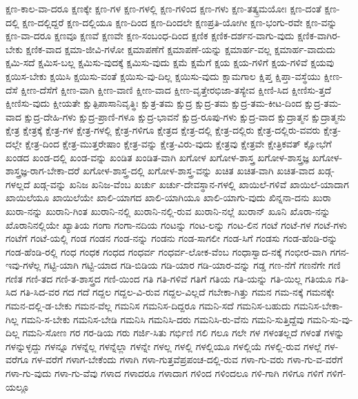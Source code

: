 {ಕ್ಷಣ-ಕಾಲ-ವಾ-ದರೂ
ಕ್ಷಣಕ್ಕೇ
ಕ್ಷಣ-ಗಳ
ಕ್ಷಣ-ಗಳಲ್ಲಿ
ಕ್ಷಣ-ಗಳಿಂದ
ಕ್ಷಣ-ಗಳು
ಕ್ಷಣ-ತತ್ಕ್ರಮಯೋಃ
ಕ್ಷಣ-ದಂತೆ
ಕ್ಷಣ-ದಲ್ಲಿ
ಕ್ಷಣ-ದಲ್ಲಿದ್ದರೆ
ಕ್ಷಣ-ದಲ್ಲಿಯೂ
ಕ್ಷಣ-ದಿಂದ
ಕ್ಷಣ-ದಿಂದಲೇ
ಕ್ಷಣಪ್ರತಿ-ಯೋಗೀ
ಕ್ಷಣ-ಭಂಗು-ರವೇ
ಕ್ಷಣ-ವನ್ನು
ಕ್ಷಣ-ವಾ-ದರೂ
ಕ್ಷಣವೂ
ಕ್ಷಣವೆ
ಕ್ಷಣವೇ
ಕ್ಷಣ-ಸಂಬಂಧ-ದಿಂದ
ಕ್ಷಣಿಕ
ಕ್ಷಣಿಕ-ದರ್ಶನ-ವಾಗು-ವುದು
ಕ್ಷಣಿಕ-ವಾಗಿರ-ಬೇಕು
ಕ್ಷಣಿಕ-ವಾದ
ಕ್ಷಮಾ-ಜೀವಿ-ಗಳೋ
ಕ್ಷಮಾಪಣೆಗೆ
ಕ್ಷಮಾಪಣೆ-ಯನ್ನು
ಕ್ಷಮಾರ್ಹ-ವಲ್ಲ
ಕ್ಷಮಾರ್ಹ-ವಾದುದು
ಕ್ಷಮಿ-ಸದೆ
ಕ್ಷಮಿಸ-ಬಲ್ಲ
ಕ್ಷಮಿಸು-ವುದಕ್ಕೆ
ಕ್ಷಮಿಸು-ವುದು
ಕ್ಷಮೆ
ಕ್ಷಮೆಗೆ
ಕ್ಷಯ
ಕ್ಷಯ-ಗಳಿಗೆ
ಕ್ಷಯ-ಗಳಿವೆ
ಕ್ಷಯವು
ಕ್ಷಯಿಸ-ಬೇಕು
ಕ್ಷಯಿಸಿ
ಕ್ಷಯಿಸು-ವಂತೆ
ಕ್ಷಯಿಸು-ವು-ದಿಲ್ಲ
ಕ್ಷಯಿಸು-ವುದು
ಕ್ಷಾಮಗಾಲ
ಕ್ಷಿಪ್ತ
ಕ್ಷಿಪ್ತಾ-ವಸ್ಥೆಯು
ಕ್ಷೀಣ-ದೆಸೆ
ಕ್ಷೀಣ-ದೆಸೆಗೆ
ಕ್ಷೀಣ-ವಾಗಿ
ಕ್ಷೀಣ-ವಾಣಿ
ಕ್ಷೀಣ-ವಾದ
ಕ್ಷೀಣ-ವೃತ್ತೇರಭಿಜಾ-ತಸ್ಯೇವ
ಕ್ಷೀಣಿ-ಸಿದ
ಕ್ಷೀಣಿಸು-ತ್ತದೆ
ಕ್ಷೀಣಿಸು-ವುದು
ಕ್ಷೀಯತೇ
ಕ್ಷುತ್ಪಿಪಾಸಾನಿವೃತ್ಥಿಃ
ಕ್ಷುತ್ರ-ತಮ
ಕ್ಷುದ್ರ
ಕ್ಷುದ್ರ-ತಮ
ಕ್ಷುದ್ರ-ತಮ-ಕೀಟ-ದಿಂದ
ಕ್ಷುದ್ರ-ತಮ-ವಾದ
ಕ್ಷುದ್ರ-ದೇಹಿ-ಗಳು
ಕ್ಷುದ್ರ-ಪ್ರಾಣಿ-ಗಳೂ
ಕ್ಷುದ್ರ-ಭಾವನೆ
ಕ್ಷುದ್ರ-ರೂಪು-ಗಳು
ಕ್ಷುದ್ರ-ವಾದ
ಕ್ಷುದ್ರಾತ್ಮನ
ಕ್ಷುದ್ರಾತ್ಮನು
ಕ್ಷೇತ್ರ
ಕ್ಷೇತ್ರಕ್ಕೆ
ಕ್ಷೇತ್ರ-ಗಳ
ಕ್ಷೇತ್ರ-ಗಳಲ್ಲಿ
ಕ್ಷೇತ್ರ-ಗಳಿಗೂ
ಕ್ಷೇತ್ರದ
ಕ್ಷೇತ್ರ-ದಲ್ಲಿ
ಕ್ಷೇತ್ರ-ದಲ್ಲಿರು
ಕ್ಷೇತ್ರ-ದಲ್ಲಿರು-ವವರು
ಕ್ಷೇತ್ರ-ದಲ್ಲೇ
ಕ್ಷೇತ್ರ-ದಿಂದ
ಕ್ಷೇತ್ರ-ಮುತ್ತರೇಷಾಂ
ಕ್ಷೇತ್ರ-ವನ್ನು
ಕ್ಷೇತ್ರ-ವಿರು-ವುದು
ಕ್ಷೇತ್ರವು
ಕ್ಷೇತ್ರವೇ
ಕ್ಷೇತ್ರಿಕವತ್
ಕ್ಷೋಭೆಗೆ
ಖಂಡದ
ಖಂಡ-ದಲ್ಲಿ
ಖಂಡ-ವನ್ನು
ಖಂಡಿತ
ಖಂಡಿತ-ವಾಗಿ
ಖಗೋಳ
ಖಗೋಳ-ಶಾಸ್ತ್ರ
ಖಗೋಳ-ಶಾಸ್ತ್ರಜ್ಞ
ಖಗೋಳ-ಶಾಸ್ತ್ರಜ್ಞ-ರಾಗ-ಬೇಕಾ-ದರೆ
ಖಗೋಳ-ಶಾಸ್ತ್ರ-ದಲ್ಲಿ
ಖಗೋಳ-ಶಾಸ್ತ್ರ-ವನ್ನು
ಖಚಿತ
ಖಚಿತ-ವಾಗಿ
ಖಚಿತ-ವಾದ
ಖಡ್ಗ-ಗಳಲ್ಲದೆ
ಖಡ್ಗ-ವನ್ನು
ಖನಿಜ
ಖನಿಜ-ವೆಂಬ
ಖರ್ಚು
ಖರ್ಚು-ದೇವಸ್ಥಾನ-ಗಳಲ್ಲಿ
ಖಾಯಿಲೆ-ಗಳಿವೆ
ಖಾಯಿಲೆ-ಯಾದಾಗ
ಖಾಯಿಲೆಯೂ
ಖಾಯಿಲೆಯೇ
ಖಾಲಿ-ಯಾಗದ
ಖಾಲಿ-ಯಾಗಿಯೂ
ಖಾಲಿ-ಯಾಗು-ವುದು
ಖಿನ್ನನಾ-ದನು
ಖುರಾ
ಖುರಾ-ನನ್ನು
ಖುರಾನಿ-ಗಿಂತ
ಖುರಾನಿ-ನಲ್ಲಿ
ಖುರಾನಿ-ನಲ್ಲಿ-ರುವ
ಖುರಾನಿ-ನಲ್ಲೆ
ಖುರಾನ್
ಖೂನಿ
ಖೊರಾ-ನನ್ನು
ಖೊರಾನಿನಲ್ಲಿಯೇ
ಖ್ಯಾತಿಯ
ಗಂಗಾ
ಗಂಗಾ-ನದಿಯ
ಗಂಟನ್ನು
ಗಂಟ-ಲನ್ನು
ಗಂಟ-ಲಿನ
ಗಂಟೆ
ಗಂಟೆ-ಗಳ
ಗಂಟೆ-ಗಳು
ಗಂಟೆಗೆ
ಗಂಟೆ-ಯಲ್ಲಿ
ಗಂಡ
ಗಂಡನ
ಗಂಡ-ನನ್ನು
ಗಂಡನು
ಗಂಡ-ಸಾಗಲೀ
ಗಂಡ-ಸಿಗೆ
ಗಂಡಸು
ಗಂಡ-ಹೆಂಡಿ-ರನ್ನು
ಗಂಡ-ಹೆಂಡಿ-ರಲ್ಲಿ
ಗಂಧ
ಗಂಧಕ
ಗಂಧದ
ಗಂಧರ್ವ
ಗಂಧರ್ವ-ಲೋಕ-ವೆಂಬ
ಗಂಧಾಸ್ವಾದ-ನಕ್ಕೆ
ಗಂಭೀರ-ವಾಗಿ
ಗಗನ-ಇವು-ಗಳೆಲ್ಲ
ಗಟ್ಟಿ-ಯಾಗಿ
ಗಟ್ಟಿ-ಯಾದ
ಗಡಿ-ಬಿಡಿಯ
ಗಡಿ-ಯಾರ
ಗಡಿ-ಯಾರ-ವನ್ನು
ಗಡ್ಡ
ಗಣ-ನೆಗೆ
ಗಣನೆಗೇ
ಗಣಿ
ಗಣಿತ
ಗಣಿ-ತದ
ಗಣಿ-ತ-ಶಾಸ್ತ್ರದ
ಗಣಿ-ಯಿಂದ
ಗತಿ
ಗತಿ-ಗಳಿವೆ
ಗತಿಗೆ
ಗತಿಯ
ಗತಿ-ಯನ್ನು
ಗತಿ-ಯಿಲ್ಲ
ಗತಿಯೂ
ಗತಿ-ಸಿದ
ಗತಿ-ಸಿದ-ವರ
ಗದ
ಗದೆ
ಗದ್ದಲ
ಗದ್ದಲ-ವಿ-ರುವ
ಗದ್ದಲ-ವಿಲ್ಲದೆ
ಗಬೇಕಾ-ಗಿತ್ತು
ಗಮನ
ಗಮ-ನಕ್ಕೆ
ಗಮನಕ್ಕೇ
ಗಮನ-ದಲ್ಲಿ-ಡ-ಬೇಕು
ಗಮನ-ವೆಲ್ಲ
ಗಮನಿಸ
ಗಮನಿಸ-ದಿದ್ದರೂ
ಗಮನಿ-ಸದೆ
ಗಮನಿಸ-ಬಹುದು
ಗಮನಿಸ-ಬೇಕಾ-ಗಿಲ್ಲ
ಗಮನಿ-ಸ-ಬೇಕು
ಗಮನಿಸ-ಬೇಡಿ
ಗಮನಿಸಿ
ಗಮನಿಸಿ-ದರು
ಗಮನಿಸಿ-ರು-ವೆನು
ಗಮನಿ-ಸುತ್ತಿದ್ದೆವು
ಗಮನಿ-ಸು-ವು-ದಿಲ್ಲ
ಗಮನಿ-ಸೋಣ
ಗರ
ಗರ-ಡಿಯ
ಗರು
ಗರ್ಜಿ-ಸಿತು
ಗರ್ಭಿಣಿ
ಗಲಿ
ಗಲೂ
ಗಲೇ
ಗಳ
ಗಳಂತಲ್ಲದೆ
ಗಳಂತೆ
ಗಳನ್ನು
ಗಳನ್ನುಳ್ಳದ್ದು
ಗಳನ್ನೂ
ಗಳನ್ನೆಲ್ಲ
ಗಳನ್ನೆಲ್ಲಾ
ಗಳನ್ನೇ
ಗಳಲ್ಲ
ಗಳಲ್ಲಿ
ಗಳಲ್ಲಿಯೂ
ಗಳಲ್ಲಿಯೆ
ಗಳಲ್ಲಿ-ರುವ
ಗಳಲ್ಲೆ
ಗಳ-ವರೆಗೂ
ಗಳ-ವರೆಗೆ
ಗಳಾಗ-ಬೇಕೆಂದು
ಗಳಾಗಿ
ಗಳಾ-ಗುತ್ತವೆಪ್ರಪಂಚ-ದಲ್ಲಿ-ರುವ
ಗಳಾ-ಗು-ವರು
ಗಳಾ-ಗು-ವ-ವರೆಗೆ
ಗಳಾ-ಗು-ವುದು
ಗಳಾ-ಗು-ವೆವು
ಗಳಾದ
ಗಳಾದರೂ
ಗಳಾದಾಗ
ಗಳಿಂದ
ಗಳಿಂದಲೂ
ಗಳಿ-ಗಾಗಿ
ಗಳಿಗೂ
ಗಳಿಗೆ
ಗಳಿಗೆ-ಯಲ್ಲೂ
}
